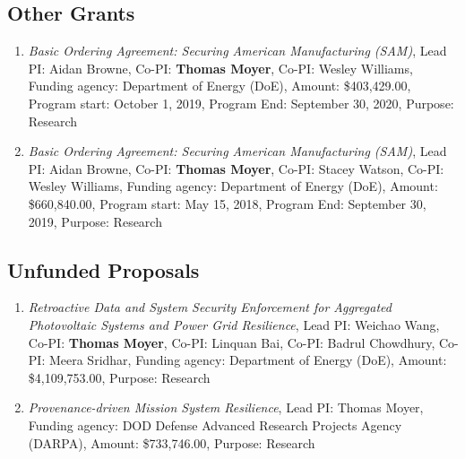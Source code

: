 
\setcounter{subsection}{5} %
\hypertarget{other-grants}{%
\subsection{Other Grants}\label{other-grants}}

\begin{enumerate}
\item \textit{Basic Ordering Agreement: Securing American Manufacturing (SAM)}, Lead PI: Aidan Browne, Co-PI: \textbf{Thomas Moyer}, Co-PI: Wesley Williams, Funding agency: Department of Energy (DoE), Amount: \$403,429.00, Program start: October 1, 2019, Program End: September 30, 2020, Purpose: Research
\item \textit{Basic Ordering Agreement: Securing American Manufacturing (SAM)}, Lead PI: Aidan Browne, Co-PI: \textbf{Thomas Moyer}, Co-PI: Stacey Watson, Co-PI: Wesley Williams, Funding agency: Department of Energy (DoE), Amount: \$660,840.00, Program start: May 15, 2018, Program End: September 30, 2019, Purpose: Research
\end{enumerate}

\hypertarget{unfunded-proposals}{%
\subsection{Unfunded Proposals}\label{unfunded-proposals}}

\begin{enumerate}
\item \textit{Retroactive Data and System Security Enforcement for Aggregated Photovoltaic Systems and Power Grid Resilience}, Lead PI: Weichao Wang, Co-PI: \textbf{Thomas Moyer}, Co-PI: Linquan Bai, Co-PI: Badrul Chowdhury, Co-PI: Meera Sridhar, Funding agency: Department of Energy (DoE), Amount: \$4,109,753.00, Purpose: Research
\item \textit{Provenance-driven Mission System Resilience}, Lead PI: Thomas Moyer, Funding agency: DOD Defense Advanced Research Projects Agency (DARPA), Amount: \$733,746.00, Purpose: Research
\end{enumerate}
